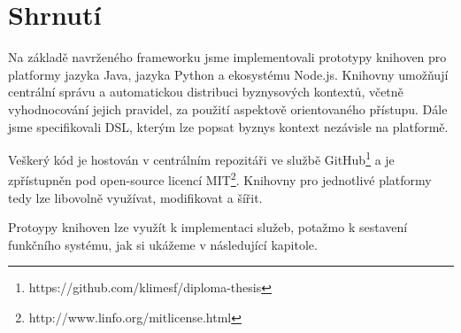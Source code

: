\section{Shrnutí}

Na základě navrženého frameworku jsme implementovali prototypy
knihoven pro platformy jazyka Java, jazyka Python a ekosystému
Node.js. Knihovny umožňují centrální správu a automatickou distribuci
byznysových kontextů, včetně vyhodnocování jejich pravidel, za
použití aspektově orientovaného přístupu.
Dále jsme specifikovali DSL, kterým lze popsat byznys kontext
nezávisle na platformě.

Veškerý kód je hostován v centrálním repozitáři
ve službě GitHub\footnote{
https://github.com/klimesf/diploma-thesis
} a je zpřístupněn pod open-source licencí MIT\footnote{
http://www.linfo.org/mitlicense.html
}. Knihovny pro jednotlivé platformy tedy lze libovolně
využívat, modifikovat a šířit.

Protoypy knihoven lze využít k implementaci služeb,
potažmo k sestavení funkčního systému, jak si ukážeme
v následující kapitole.
